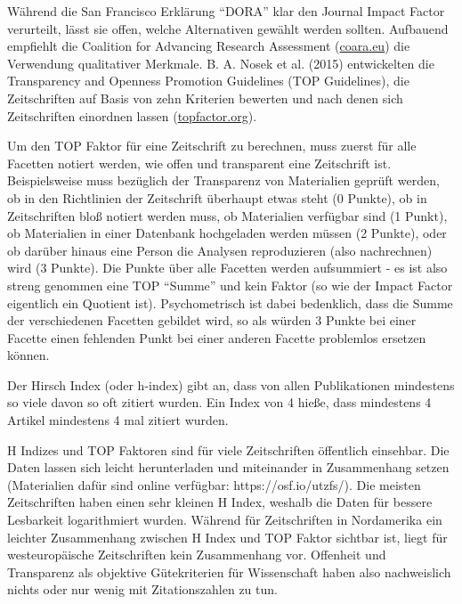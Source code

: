 \documentclass[
  letterpaper,
  DIV=11,
  numbers=noendperiod]{scrreprt}
\begin{document}
Während die San Francisco Erklärung ``DORA'' klar den Journal Impact
Factor verurteilt, lässt sie offen, welche Alternativen gewählt werden
sollten. Aufbauend empfiehlt die Coalition for Advancing Research
Assessment (\href{https://coara.eu/}{coara.eu}) die Verwendung
qualitativer Merkmale. B. A. Nosek et al. (2015) entwickelten die
Transparency and Openness Promotion Guidelines (TOP Guidelines), die
Zeitschriften auf Basis von zehn Kriterien bewerten und nach denen sich
Zeitschriften einordnen lassen (\url{topfactor.org}).

\begin{tcolorbox}[enhanced jigsaw, left=2mm, colback=white, colframe=quarto-callout-note-color-frame, opacitybacktitle=0.6, opacityback=0, title=\textcolor{quarto-callout-note-color}{\faInfo}\hspace{0.5em}{TOP Faktor versus Hirsch Index}, toptitle=1mm, coltitle=black, colbacktitle=quarto-callout-note-color!10!white, titlerule=0mm, bottomtitle=1mm, leftrule=.75mm, breakable, rightrule=.15mm, bottomrule=.15mm, toprule=.15mm, arc=.35mm]

Um den TOP Faktor für eine Zeitschrift zu berechnen, muss zuerst für
alle Facetten notiert werden, wie offen und transparent eine Zeitschrift
ist. Beispielsweise muss bezüglich der Transparenz von Materialien
geprüft werden, ob in den Richtlinien der Zeitschrift überhaupt etwas
steht (0 Punkte), ob in Zeitschriften bloß notiert werden muss, ob
Materialien verfügbar sind (1 Punkt), ob Materialien in einer Datenbank
hochgeladen werden müssen (2 Punkte), oder ob darüber hinaus eine Person
die Analysen reproduzieren (also nachrechnen) wird (3 Punkte). Die
Punkte über alle Facetten werden aufsummiert - es ist also streng
genommen eine TOP ``Summe'' und kein Faktor (so wie der Impact Factor
eigentlich ein Quotient ist). Psychometrisch ist dabei bedenklich, dass
die Summe der verschiedenen Facetten gebildet wird, so als würden 3
Punkte bei einer Facette einen fehlenden Punkt bei einer anderen Facette
problemlos ersetzen können.

Der Hirsch Index (oder h-index) gibt an, dass von allen Publikationen
mindestens so viele davon so oft zitiert wurden. Ein Index von 4 hieße,
dass mindestens 4 Artikel mindestens 4 mal zitiert wurden.

H Indizes und TOP Faktoren sind für viele Zeitschriften öffentlich
einsehbar. Die Daten lassen sich leicht herunterladen und miteinander in
Zusammenhang setzen (Materialien dafür sind online verfügbar:
https://osf.io/utzfs/). Die meisten Zeitschriften haben einen sehr
kleinen H Index, weshalb die Daten für bessere Lesbarkeit logarithmiert
wurden. Während für Zeitschriften in Nordamerika ein leichter
Zusammenhang zwischen H Index und TOP Faktor sichtbar ist, liegt für
westeuropäische Zeitschriften kein Zusammenhang vor. Offenheit und
Transparenz als objektive Gütekriterien für Wissenschaft haben also
nachweislich nichts oder nur wenig mit Zitationszahlen zu tun.


\end{tcolorbox}
\end{document}
